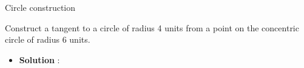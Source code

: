 \begin{frame}{Circle construction}

 Construct a tangent to a circle of radius 4 units
from a point on the concentric circle of radius
6 units.\\
\begin{itemize}
\item\textbf{Solution} :\\

\end{itemize}
\\
\seti
\end{frame}